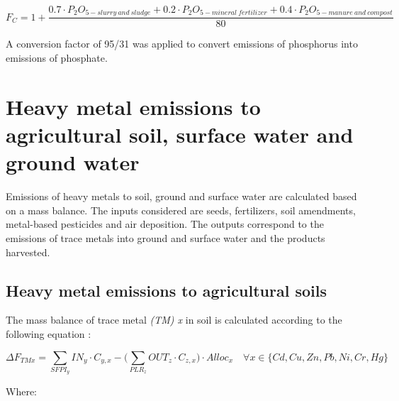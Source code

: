\documentclass[openany]{book}
\begin{document}
\[F_C=1+ \frac{0.7 \cdot P_2O_{5-slurry\: and \: sludge} + 0.2 \cdot P_2O_{5-mineral \: fertilizer} + 0.4  \cdot P_2O_{5-manure\: and\: compost}}{80}\]

A conversion factor of 95/31 was applied to convert emissions of phosphorus into emissions of phosphate.

\hypertarget{heavy-metal-emissions-to-agricultural-soil-surface-water-and-ground-water}{%
\section{Heavy metal emissions to agricultural soil, surface water and ground water}\label{heavy-metal-emissions-to-agricultural-soil-surface-water-and-ground-water}}

Emissions of heavy metals to soil, ground and surface water are calculated based on a mass balance. The inputs considered are seeds, fertilizers, soil amendments, metal-based pesticides and air deposition. The outputs correspond to the emissions of trace metals into ground and surface water and the products harvested.

\hypertarget{heavy-metal-emissions-to-agricultural-soils}{%
\subsection{Heavy metal emissions to agricultural soils}\label{heavy-metal-emissions-to-agricultural-soils}}

The mass balance of trace metal \emph{(TM) x} in soil is calculated according to the following equation \citep{Koch2015}:

\[\Delta F_{TMx}=\sum_{SFPI_y}IN_y \cdot C_{y,x} - \Big (\sum_{PLR_z} OUT_z \cdot C_{z,x} \Big) \cdot Alloc_x \quad \forall x \in \{Cd,Cu,Zn,Pb,Ni,Cr,Hg\}\]

Where:
\end{document}
